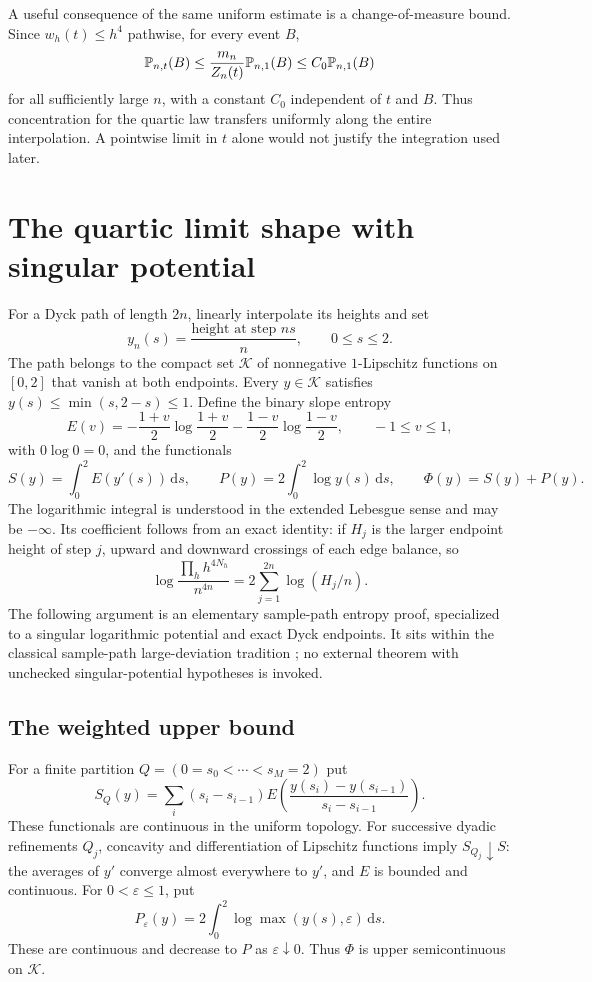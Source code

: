 \documentclass[11pt,letterpaper]{article}
\numberwithin{equation}{section}
\theoremstyle{remark}\newtheorem{remark}[theorem]{Remark}
\newcommand{\K}{\mathcal K}\newcommand{\ee}{\mathrm e}\newcommand{\dd}{\,\mathrm d}
\begin{document}
A useful consequence of the same uniform estimate is a change-of-measure bound. Since $w_h(t)\le h^4$ pathwise, for every event $B$,
\begin{equation}\label{pwd:qt:eq:RN}
 \mathbb P_{n,t}(B)\le\frac{m_n}{Z_n(t)}\mathbb P_{n,1}(B)
 \le C_0\mathbb P_{n,1}(B)
\end{equation}
for all sufficiently large $n$, with a constant $C_0$ independent of $t$ and $B$. Thus concentration for the quartic law transfers uniformly along the entire interpolation. A pointwise limit in $t$ alone would not justify the integration used later.

\section{The quartic limit shape with singular potential}\label{pwd:qt:sec:shape}
For a Dyck path of length $2n$, linearly interpolate its heights and set
\[
 y_n(s)=\frac{\text{height at step }ns}{n},\qquad 0\le s\le2.
\]
The path belongs to the compact set $\K$ of nonnegative $1$-Lipschitz functions on $[0,2]$ that vanish at both endpoints. Every $y\in\K$ satisfies $y(s)\le\min(s,2-s)\le1$. Define the binary slope entropy
\[
 E(v)=-\frac{1+v}{2}\log\frac{1+v}{2}
       -\frac{1-v}{2}\log\frac{1-v}{2},\qquad -1\le v\le1,
\]
with $0\log0=0$, and the functionals
\begin{equation}\label{pwd:qt:eq:functional}
 S(y)=\int_0^2E(y'(s))\dd s,\qquad
 P(y)=2\int_0^2\log y(s)\dd s,\qquad \Phi(y)=S(y)+P(y).
\end{equation}
The logarithmic integral is understood in the extended Lebesgue sense and may be $-\infty$. Its coefficient follows from an exact identity: if $H_j$ is the larger endpoint height of step $j$, upward and downward crossings of each edge balance, so
\begin{equation}\label{pwd:qt:eq:edge-weight}
 \log\frac{\prod_hh^{4N_h}}{n^{4n}}
 =2\sum_{j=1}^{2n}\log(H_j/n).
\end{equation}
The following argument is an elementary sample-path entropy proof, specialized to a singular logarithmic potential and exact Dyck endpoints. It sits within the classical sample-path large-deviation tradition \cite{mogulskii}; no external theorem with unchecked singular-potential hypotheses is invoked.

\subsection{The weighted upper bound}
For a finite partition $Q=(0=s_0<\cdots<s_M=2)$ put
\[
 S_Q(y)=\sum_i(s_i-s_{i-1})E\left(\frac{y(s_i)-y(s_{i-1})}{s_i-s_{i-1}}\right).
\]
These functionals are continuous in the uniform topology. For successive dyadic refinements $Q_j$, concavity and differentiation of Lipschitz functions imply $S_{Q_j}\downarrow S$: the averages of $y'$ converge almost everywhere to $y'$, and $E$ is bounded and continuous. For $0<\varepsilon\le1$, put
\[
 P_\varepsilon(y)=2\int_0^2\log\max(y(s),\varepsilon)\dd s.
\]
These are continuous and decrease to $P$ as $\varepsilon\downarrow0$. Thus $\Phi$ is upper semicontinuous on $\K$.
\end{document}
